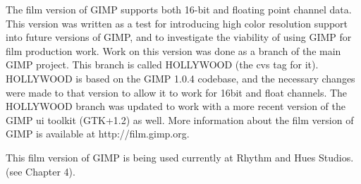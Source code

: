 The film version of GIMP supports both 16-bit and floating point channel data.
This version was written as a test for introducing high color resolution
support into future versions of GIMP, and to investigate the viability of using
GIMP for film production work. Work on this version was done as a branch of the
main GIMP project. This branch is called HOLLYWOOD (the cvs tag for it).
HOLLYWOOD is based on the GIMP 1.0.4 codebase, and the necessary changes were
made to that version to allow it to work for 16bit and float channels. The
HOLLYWOOD branch was updated to work with a more recent version of the GIMP ui
toolkit (GTK+1.2) as well.  More information about the film version of GIMP is
available at http://film.gimp.org.

This film version of GIMP is being used currently at Rhythm and Hues Studios.
(see Chapter 4).
